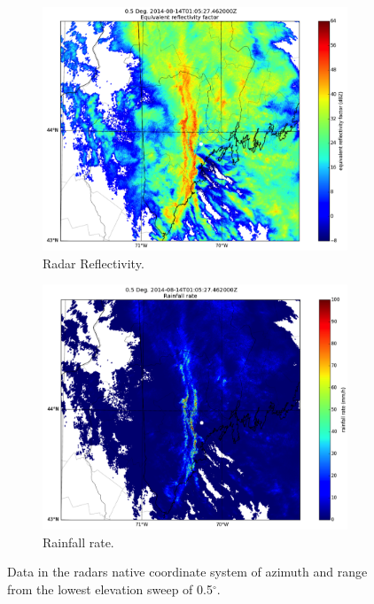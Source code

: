 \documentclass[twocol]{ametsoc}
\begin{document}
\begin{figure}[h]
    \centering
    \begin{subfigure}[b]{0.4\columnwidth}
        \includegraphics[width=\columnwidth]{refl.png}
        \caption{Radar Reflectivity.}
        \label{fig:z}
    \end{subfigure}
    \begin{subfigure}[b]{0.4\columnwidth}
        \includegraphics[width=\columnwidth]{rainfall.png}
        \caption{Rainfall rate.}
        \label{fig:rainfall}
    \end{subfigure}
    \caption{Data in the radars native coordinate system of azimuth and range from the lowest elevation sweep of 0.5$^\circ$. }
\end{figure}
\end{document}
